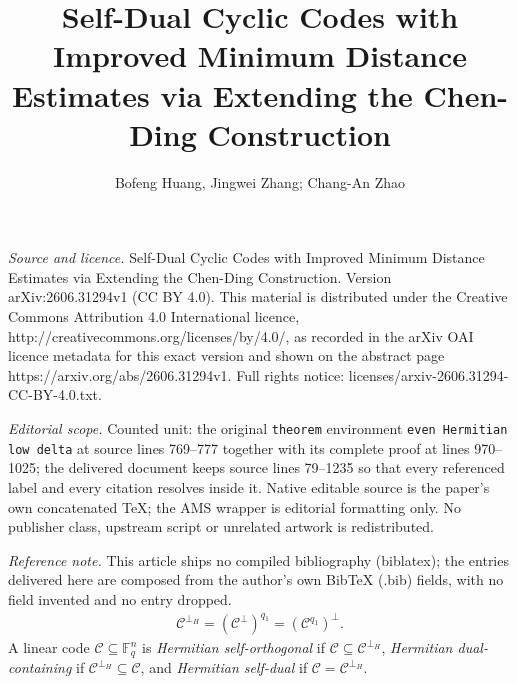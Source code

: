 \documentclass[10pt,a4paper]{amsart}
\begin{document}
\title[Self-Dual Cyclic Codes with Improved Minimum Distance Estima]{Self-Dual Cyclic Codes with Improved Minimum Distance Estimates via Extending the Chen-Ding Construction}
\author{Bofeng Huang, Jingwei Zhang; Chang-An Zhao}
\date{}
\maketitle
\noindent\emph{Source and licence.} Self-Dual Cyclic Codes with Improved Minimum Distance Estimates via Extending the Chen-Ding Construction. Version arXiv:2606.31294v1 (CC BY 4.0). This material is distributed under the Creative Commons Attribution 4.0 International licence, http://creativecommons.org/licenses/by/4.0/, as recorded in the arXiv OAI licence metadata for this exact version and shown on the abstract page https://arxiv.org/abs/2606.31294v1. Full rights notice: licenses/arxiv-2606.31294-CC-BY-4.0.txt.\par\smallskip
\noindent\textit{Editorial scope.} Counted unit: the original \texttt{theorem} environment \texttt{even Hermitian low delta} at source lines 769--777 together with its complete proof at lines 970--1025; the delivered document keeps source lines 79--1235 so that every referenced label and every citation resolves inside it. Native editable source is the paper's own concatenated TeX; the AMS wrapper is editorial formatting only. No publisher class, upstream script or unrelated artwork is redistributed.
\par\smallskip\noindent\textit{Reference note.} This article ships no compiled bibliography (biblatex); the entries delivered here are composed from the author's own BibTeX (.bib) fields, with no field invented and no entry dropped.
\begin{align}
    \label{(1)}
    \mathcal{C}^{\perp_H}=(\mathcal{C}^\perp)^{q_1}=(\mathcal{C}^{q_1})^\perp.
\end{align}
A linear code $\mathcal{C}\subseteq\mathbb{F}_q^n$ is \textit{Hermitian self-orthogonal} if $\mathcal{C}\subseteq \mathcal{C}^{\perp_H}$, \textit{Hermitian dual-containing} if $\mathcal{C}^{\perp_H}\subseteq\mathcal{C}$, and \textit{Hermitian self-dual} if $\mathcal{C}=\mathcal{C}^{\perp_H}$.
\end{document}
